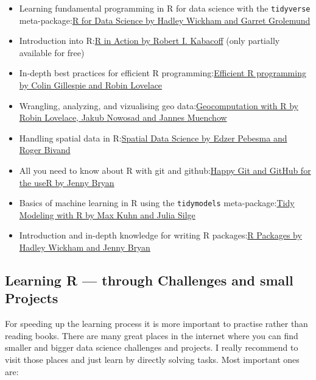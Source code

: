 \documentclass[
  letterpaper,
  DIV=11,
  numbers=noendperiod]{scrreprt}
\providecommand{\tightlist}{%
  \setlength{\itemsep}{0pt}\setlength{\parskip}{0pt}}\usepackage{longtable,booktabs,array}
\begin{document}
\begin{itemize}
\tightlist
\item
  Learning fundamental programming in R for data science with the
  \texttt{tidyverse}
  meta-package:\href{https://r4ds.had.co.nz/index.html}{R for Data
  Science \textbar{} by Hadley Wickham and Garret Grolemund}
\item
  Introduction into
  R:\href{https://livebook.manning.com/book/r-in-action-third-edition/r-in-action/4}{R
  in Action \textbar{} by Robert I. Kabacoff} (only partially available
  for free)
\item
  In-depth best practices for efficient R
  programming:\href{https://csgillespie.github.io/efficientR/}{Efficient
  R programming \textbar{} by Colin Gillespie and Robin Lovelace}
\item
  Wrangling, analyzing, and vizualising geo
  data:\href{https://geocompr.robinlovelace.net/index.html}{Geocomputation
  with R \textbar{} by Robin Lovelace, Jakub Nowosad and Jannes
  Muenchow}
\item
  Handling spatial data in R:\href{https://r-spatial.org/book/}{Spatial
  Data Science \textbar{} by Edzer Pebesma and Roger Bivand}
\item
  All you need to know about R with git and
  github:\href{https://happygitwithr.com/index.html}{Happy Git and
  GitHub for the useR \textbar{} by Jenny Bryan}
\item
  Basics of machine learning in R using the \texttt{tidymodels}
  meta-package:\href{https://www.tmwr.org/}{Tidy Modeling with R
  \textbar{} by Max Kuhn and Julia Silge}
\item
  Introduction and in-depth knowledge for writing R
  packages:\href{https://r-pkgs.org/}{R Packages \textbar{} by Hadley
  Wickham and Jenny Bryan}
\end{itemize}

\hypertarget{learning-r-through-challenges-and-small-projects}{%
\subsection{Learning R --- through Challenges and small
Projects}\label{learning-r-through-challenges-and-small-projects}}

For speeding up the learning process it is more important to practise
rather than reading books. There are many great places in the internet
where you can find smaller and bigger data science challenges and
projects. I really recommend to visit those places and just learn by
directly solving tasks. Most important ones are:
\end{document}
